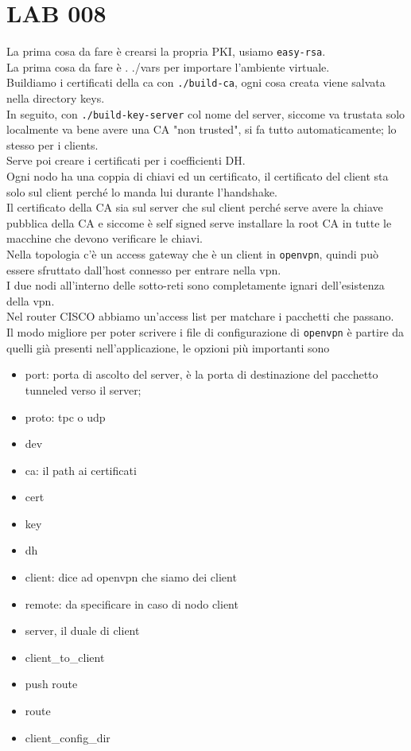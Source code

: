 \documentclass[12pt, oneside]{extbook} %
\begin{document}
\section*{LAB 008}
La prima cosa da fare è crearsi la propria PKI, usiamo \texttt{easy-rsa}.
\\La prima cosa da fare è . ./vars per importare l'ambiente virtuale.
\\Buildiamo i certificati della ca con \texttt{./build-ca}, ogni cosa creata viene salvata nella directory keys.
\\In seguito, con \texttt{./build-key-server} col nome del server, siccome va trustata solo localmente va bene avere una CA "non trusted", si fa tutto automaticamente; lo stesso per i clients.
\\Serve poi creare i certificati per i coefficienti DH.
\\Ogni nodo ha una coppia di chiavi ed un certificato, il certificato del client sta solo sul client perché lo manda lui durante l'handshake.
\\Il certificato della CA sia sul server che sul client perché serve avere la chiave pubblica della CA e siccome è self signed serve installare la root CA in tutte le macchine che devono verificare le chiavi.
\\Nella topologia c'è un access gateway che è un client in \texttt{openvpn}, quindi può essere sfruttato dall'host connesso per entrare nella vpn.
\\I due nodi all'interno delle sotto-reti sono completamente ignari dell'esistenza della vpn.
\\Nel router CISCO abbiamo un'access list per matchare i pacchetti che passano.
\\Il modo migliore per poter scrivere i file di configurazione di \texttt{openvpn} è partire da quelli già presenti nell'applicazione, le opzioni più importanti sono
\begin{itemize}
    \item port: porta di ascolto del server, è la porta di destinazione del pacchetto tunneled verso il server;
    \item proto: tpc o udp
    \item dev
    \item ca: il path ai certificati
    \item cert
    \item key
    \item dh
    \item client: dice ad openvpn che siamo dei client 
    \item remote: da specificare in caso di nodo client
    \item server, il duale di client
    \item client\_to\_client
    \item push route
    \item route
    \item client\_config\_dir
\end{itemize}
\end{document}
